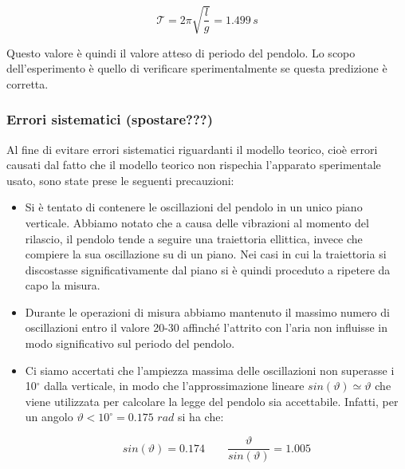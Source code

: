 \begin{equation}
    \mathcal{T} = 2\pi \sqrt{\frac{l}{g}} = 1.499 \, s 
\end{equation}

Questo valore è quindi il valore atteso di periodo del pendolo. Lo scopo
dell'esperimento è quello di verificare sperimentalmente se questa predizione
è corretta.

\subsubsection{Errori sistematici (spostare???)}

Al fine di evitare errori sistematici riguardanti il modello teorico,
cioè errori causati dal fatto che il modello teorico non rispechia l'apparato
sperimentale usato, sono state prese le seguenti precauzioni:

\begin{itemize}
    \item{Si è tentato di contenere le oscillazioni del pendolo in un
        unico piano verticale. Abbiamo notato che a causa delle
        vibrazioni al momento del rilascio, il pendolo tende a seguire una
        traiettoria ellittica, invece che compiere la sua oscillazione su di un piano.
        Nei casi in cui la traiettoria si discostasse significativamente dal piano
        si è quindi proceduto a ripetere da capo la misura.}
    
    \item{Durante le operazioni di misura abbiamo mantenuto il massimo numero
        di oscillazioni entro il valore 20-30 affinché l'attrito con l'aria
        non influisse in modo significativo sul periodo del pendolo.}

    \item{Ci siamo accertati che l'ampiezza massima delle
        oscillazioni non superasse i 10$^\circ$ dalla verticale, in modo che
        l'approssimazione lineare $sin(\vartheta) \simeq \vartheta$ che viene
        utilizzata per calcolare la legge del pendolo sia accettabile. Infatti, per un
        angolo $\vartheta < 10^\circ = 0.175 \,\, rad$ si ha che:}

    \begin{equation}
        sin(\vartheta) = 0.174 \qquad \frac{\vartheta}{sin(\vartheta)} = 1.005
    \end{equation}

\end{itemize}

